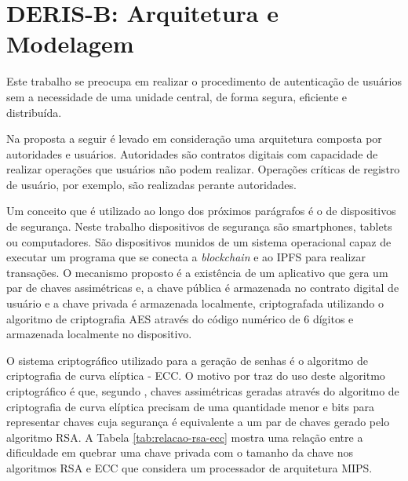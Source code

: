 \documentclass[tcc,capa]{texufpel}
\begin{document}

\chapter{DERIS-B: Arquitetura e Modelagem}\label{chap:modelagem}

    Este trabalho se preocupa em realizar o procedimento de autenticação de usuários sem a necessidade de uma unidade central, de forma segura, eficiente e distribuída.
    
    Na proposta a seguir é levado em consideração uma arquitetura composta por autoridades e usuários. Autoridades são contratos digitais com capacidade de realizar operações que usuários não podem realizar. Operações críticas de registro de usuário, por exemplo, são realizadas perante autoridades. 
    
    Um conceito que é utilizado ao longo dos próximos parágrafos é o de dispositivos de segurança. Neste trabalho dispositivos de segurança são smartphones, tablets ou computadores. São dispositivos munidos de um sistema operacional capaz de executar um programa que se conecta a \textit{blockchain} e ao IPFS para realizar transações. O mecanismo proposto é a existência de um aplicativo que gera um par de chaves assimétricas e, a chave pública é armazenada no contrato digital de usuário e a chave privada é armazenada localmente, criptografada utilizando o algoritmo de criptografia AES através do código numérico de 6 dígitos e armazenada localmente no dispositivo.
    
    O sistema criptográfico utilizado para a geração de senhas é o algoritmo de criptografia de curva elíptica - ECC. O motivo por traz do uso deste algoritmo criptográfico é que, segundo \cite{Kapoor:2008:ECC:1386853.1378356}, chaves assimétricas geradas através do algoritmo de criptografia de curva elíptica precisam de uma quantidade menor e bits para representar chaves cuja segurança é equivalente a um par de chaves gerado pelo algoritmo RSA. A Tabela \ref{tab:relacao-rsa-ecc} mostra uma relação entre a dificuldade em quebrar uma chave privada com o tamanho da chave nos algoritmos RSA e ECC que considera um processador de arquitetura MIPS.
    
\end{document}
